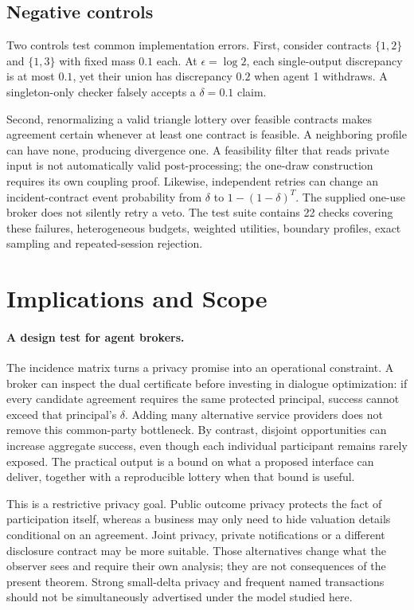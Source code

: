 \documentclass[sigconf,nonacm]{aamas}
\begin{document}
\subsection{Negative controls}
Two controls test common implementation errors. First, consider contracts $\{1,2\}$ and $\{1,3\}$ with fixed mass $0.1$ each. At $\epsilon=\log2$, each single-output discrepancy is at most $0.1$, yet their union has discrepancy $0.2$ when agent 1 withdraws. A singleton-only checker falsely accepts a $\delta=0.1$ claim.

Second, renormalizing a valid triangle lottery over feasible contracts makes agreement certain whenever at least one contract is feasible. A neighboring profile can have none, producing divergence one. A feasibility filter that reads private input is not automatically valid post-processing; the one-draw construction requires its own coupling proof. Likewise, independent retries can change an incident-contract event probability from $\delta$ to $1-(1-\delta)^T$. The supplied one-use broker does not silently retry a veto. The test suite contains 22 checks covering these failures, heterogeneous budgets, weighted utilities, boundary profiles, exact sampling and repeated-session rejection.

\section{Implications and Scope}\label{sec:discussion}
\paragraph{A design test for agent brokers.}
The incidence matrix turns a privacy promise into an operational constraint. A broker can inspect the dual certificate before investing in dialogue optimization: if every candidate agreement requires the same protected principal, success cannot exceed that principal's $\delta$. Adding many alternative service providers does not remove this common-party bottleneck. By contrast, disjoint opportunities can increase aggregate success, even though each individual participant remains rarely exposed. The practical output is a bound on what a proposed interface can deliver, together with a reproducible lottery when that bound is useful.

This is a restrictive privacy goal. Public outcome privacy protects the fact of participation itself, whereas a business may only need to hide valuation details conditional on an agreement. Joint privacy, private notifications or a different disclosure contract may be more suitable. Those alternatives change what the observer sees and require their own analysis; they are not consequences of the present theorem. Strong small-delta privacy and frequent named transactions should not be simultaneously advertised under the model studied here.
\end{document}
